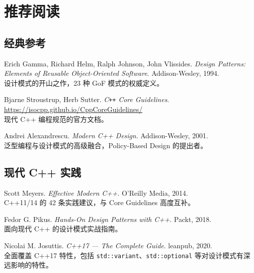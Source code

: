 \documentclass[12pt,a4paper,fontset=fandol]{ctexbook}
\begin{document}
\chapter{推荐阅读}

\section*{经典参考}

\begin{enumerate}[label=\textbf{[\arabic*]}]
  \item Erich Gamma, Richard Helm, Ralph Johnson, John Vlissides. \textit{Design Patterns: Elements of Reusable Object-Oriented Software}. Addison-Wesley, 1994.\\
  设计模式的开山之作，23 种 GoF 模式的权威定义。

  \item Bjarne Stroustrup, Herb Sutter. \textit{C\texttt{++} Core Guidelines}.\\
  \href{https://isocpp.github.io/CppCoreGuidelines/}{https://isocpp.github.io/CppCoreGuidelines/}\\
  现代 C++ 编程规范的官方文档。

  \item Andrei Alexandrescu. \textit{Modern C++ Design}. Addison-Wesley, 2001.\\
  泛型编程与设计模式的高级融合，Policy-Based Design 的提出者。
\end{enumerate}

\section*{现代 C++ 实践}

\begin{enumerate}[label=\textbf{[\arabic*]}, start=4]
  \item Scott Meyers. \textit{Effective Modern C++}. O'Reilly Media, 2014.\\
  C++11/14 的 42 条实践建议，与 Core Guidelines 高度互补。

  \item Fedor G. Pikus. \textit{Hands-On Design Patterns with C++}. Packt, 2018.\\
  面向现代 C++ 的设计模式实战指南。

  \item Nicolai M. Josuttis. \textit{C++17 --- The Complete Guide}. leanpub, 2020.\\
  全面覆盖 C++17 特性，包括 \texttt{std::variant}、\texttt{std::optional} 等对设计模式有深远影响的特性。
\end{enumerate}
\end{document}

